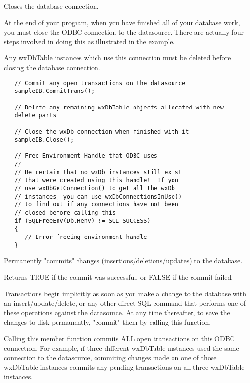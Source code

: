 \label{wxdbclose}


Closes the database connection.


At the end of your program, when you have finished all of your database work, you must close the ODBC connection to the datasource.  There are actually four steps involved in doing this as illustrated in the example.  

Any wxDbTable instances which use this connection must be deleted before closing the database connection.


\begin{verbatim}
   // Commit any open transactions on the datasource
   sampleDB.CommitTrans();

   // Delete any remaining wxDbTable objects allocated with new
   delete parts;

   // Close the wxDb connection when finished with it
   sampleDB.Close();

   // Free Environment Handle that ODBC uses
   //
   // Be certain that no wxDb instances still exist 
   // that were created using this handle!  If you
   // use wxDbGetConnection() to get all the wxDb
   // instances, you can use wxDbConnectionsInUse()
   // to find out if any connections have not been 
   // closed before calling this
   if (SQLFreeEnv(Db.Henv) != SQL_SUCCESS)
   {
      // Error freeing environment handle
   }
\end{verbatim}


\label{wxdbcommittrans}


Permanently "commits" changes (insertions/deletions/updates) to the database.  


Returns TRUE if the commit was successful, or FALSE if the commit failed.


Transactions begin implicitly as soon as you make a change to the database 
with an insert/update/delete, or any other direct SQL command that performs 
one of these operations against the datasource.  
At any time thereafter, to save the changes to disk permanently, "commit" 
them by calling this function.

Calling this member function commits ALL open transactions on this ODBC 
connection.  For example, if three different wxDbTable instances used the 
same connection to the datasource, commiting changes made on one of those 
wxDbTable instances commits any pending transactions on all three wxDbTable 
instances.

